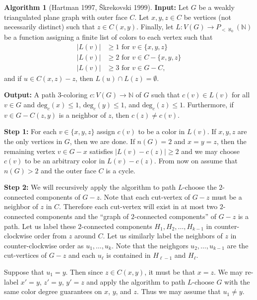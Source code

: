 \documentclass[12pt,letterpaper]{article}
\theoremstyle{plain}
\theoremstyle{definition}
\theoremstyle{break}
\newtheorem{algorithm}[lemma]{Algorithm}     %
\begin{document}
\begin{algorithm}[Hartman 1997, \v{S}krekovski 1999]\label{A:hartman3}
\textbf{Input:} Let $G$ be a weakly triangulated plane graph with outer face
$C$. Let $x,y,z\in C$ be vertices (not necessarily distinct) such that
$z\in C(x,y)$. Finally, let $L:V(G)\to P_{<\aleph_0}(\mathbb{N})$ be a
function assigning a finite list of colors to
each vertex such that
\begin{align*}
    |L(v)| &\ge 1 \text{ for } v\in\{x,y,z\} \\
    |L(v)| &\ge 2 \text{ for } v\in C-\{x,y,z\} \\
    |L(v)| &\ge 3 \text{ for } v\in G-C,
\end{align*}
    and if $u\in C(x,z)-z$, then $L(u)\cap L(z)=\emptyset$.

\textbf{Output:} A path $3$-coloring $c:V(G)\to\mathbb{N}$ of $G$ such
    that $c(v)\in L(v)$ for all $v\in G$ and $\text{deg}_c(x)\le 1$,
    $\text{deg}_c(y)\le 1$, and $\text{deg}_c(z)\le 1$. Furthermore, if
    $v\in G-C(z,y)$ is a neighbor of $z$, then $c(z)\ne c(v)$.
 
    \textbf{Step 1:} For each $v\in\{x,y,z\}$ assign
    $c(v)$ to be a color in $L(v)$. If $x,y,z$ are the only vertices in
    $G$, then we are done. If $n(G)=2$ and $x=y=z$, then the remaining
    vertex $v\in G-x$ satisfies $|L(v)-c(z)|\ge2$
    and we may choose $c(v)$ to be an arbitrary color in $L(v)-c(z)$.
    From now on assume that $n(G)>2$ and the outer
    face $C$ is a cycle.

    \textbf{Step 2:}
    We will recursively apply the algorithm to path $L$-choose
    the $2$-connected components of $G-z$. Note that each cut-vertex of $G-z$
    must be a neighbor of $z$ in $C$. Therefore each cut-vertex will
    exist in at most
    two $2$-connected components and the ``graph of $2$-connected
    components'' of $G-z$ is a path. Let us label these
    $2$-connected components $H_1,H_2,\ldots,H_{k-1}$ in counter-clockwise
    order from $z$ around $C$. Let us similarly label the neighbors
    of $z$ in counter-clockwise order as $u_1,\ldots,u_{k}$. Note that
    the neighgors $u_2,\ldots,u_{k-1}$ are the cut-vertices of $G-z$ and each
    $u_\ell$ is contained in $H_{\ell-1}$ and $H_{\ell}$.

    Suppose that $u_1=y$. Then since $z\in C(x,y)$, it must be that $x=z$.
    We may re-label $x'=y$, $z'=y$, $y'=z$ and apply the algorithm to path
    $L$-choose $G$ with the same color degree guarantees on $x$, $y$, and
    $z$. Thus we may assume that $u_1\ne y$. 


\end{algorithm}
\end{document}
